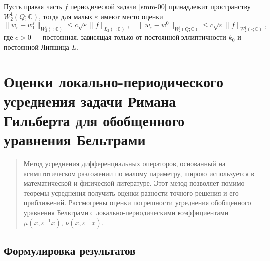 \begin{theorem}\label{smm-th1.8}
Пусть правая часть $f$ периодической задачи \eqref{smm-00} принадлежит пространству $W_2^1(Q;\mathbb{C})$, тогда для малых $\varepsilon$ имеют место оценки
		\begin{equation*}
			\|w_\varepsilon-w_1^\varepsilon\|_{W_2^1 (\square; \mathbb{C})}\leqslant c\sqrt{\varepsilon}\|f
			\|_{L_2 (\square; \mathbb{C})}, \quad \|w_\varepsilon-w^0\|_{W_2^1 (Q; \mathbb{C})}\leqslant c\sqrt{\varepsilon}\|f
			\|_{W_2^1 (\square; \mathbb{C})},
		\end{equation*}
		где $c>0$ --- постоянная, зависящая только от постоянной эллиптичности $k_0$ и постоянной Липшица $L$.
\end{theorem}

\section{Оценки локально-периодического усреднения задачи Римана -- Гильберта для обобщенного уравнения Бельтрами}	

\begin{abstract}\noindent
	Метод усреднения дифференциальных операторов, основанный на асимптотическом разложении по малому параметру, широко используется  в математической и физической литературе. Этот метод позволяет помимо теоремы усреднения получить
	оценки разности точного решения и его приближений.
	Рассмотрены оценки погрешности усреднения обобщенного уравнения Бельтрами с локально-периодическими коэффициентами $\mu(x,\varepsilon^{-1} x)$, $\nu(x,\varepsilon^{-1} x)$.
	\medskip\\

\end{abstract}

\subsection{Формулировка результатов}




